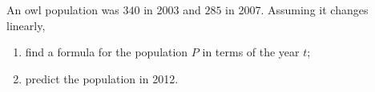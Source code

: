 An owl population was $340$ in 2003 and $285$ in 2007. Assuming it changes linearly,
\begin{enumerate}
\item[(a)] find a formula for the population $P$ in terms of the year $t$;
\item[(b)] predict the population in 2012.
\end{enumerate}
